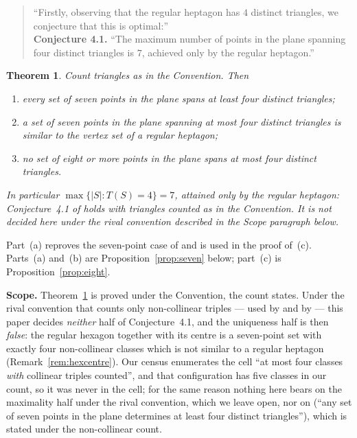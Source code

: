 \documentclass[11pt]{amsart}
\newtheorem{theorem}{Theorem}
\numberwithin{theorem}{section}
\theoremstyle{remark}
\theoremstyle{definition}
\newcommand{\Tcount}{T}
\begin{document}
\begin{quote}
``Firstly, observing that the regular heptagon has $4$ distinct triangles, we
conjecture that this is optimal:''\\[2pt]
\textbf{Conjecture 4.1.} ``The maximum number of points in the plane spanning
four distinct triangles is $7$, achieved only by the regular heptagon.''
\end{quote}

\begin{theorem}\label{thm:main}
Count triangles as in the Convention. Then
\begin{enumerate}
\item[(a)] every set of seven points in the plane spans at least four distinct
  triangles;
\item[(b)] a set of seven points in the plane spanning at most four distinct
  triangles is similar to the vertex set of a regular heptagon;
\item[(c)] no set of eight or more points in the plane spans at most four
  distinct triangles.
\end{enumerate}
In particular $\max\{|S| : \Tcount(S)=4\}=7$, attained only by the regular
heptagon: Conjecture~4.1 of \cite{PY} holds with triangles counted as in the
Convention. It is not decided here under the rival convention described in the
Scope paragraph below.
\end{theorem}

Part~(a) reproves the seven-point case of \cite[Theorem~1.1]{PY} and is used in
the proof of~(c). Parts~(a) and~(b) are Proposition~\ref{prop:seven} below;
part~(c) is Proposition~\ref{prop:eight}.

\medskip
\noindent\textbf{Scope.}
Theorem~\ref{thm:main} is proved under the Convention, the count \cite{PY}
states. Under the rival convention that counts only non-collinear triples --- used by
\cite[Definitions 3.2--3.3]{ELMP} and by \cite{BDPS} --- this paper decides
\emph{neither} half of Conjecture~4.1, and the uniqueness half is then
\emph{false}: the regular hexagon together with its centre is a seven-point set
with exactly four non-collinear classes which is not similar to a regular
heptagon (Remark~\ref{rem:hexcentre}). Our census enumerates the cell ``at most
four classes \emph{with} collinear triples counted'', and that configuration has
five classes in our count, so it was never in the cell; for the same reason
nothing here bears on the maximality half under the rival convention, which we
leave open, nor on \cite[Conjecture~2.1]{ELMP} (``any set of seven points in the
plane determines at least four distinct triangles''), which is stated under the
non-collinear count.
\end{document}

